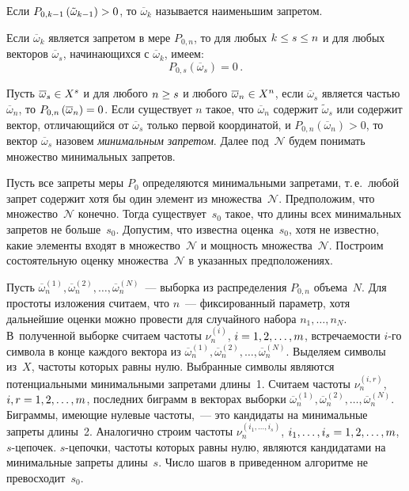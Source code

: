 \begin{multicols}{2}
  Если $P_{0,k-1}\left( \tilde{\omega}_{k-1}\right)\hm>0$, то 
$\overline{\omega}_k$ называется наименьшим запретом. 
  
  Если $\overline{\omega}_k$ является запретом в мере $P_{0,n}$, то для 
любых $k\hm\leq s\hm\leq n$ и для любых векторов $\overline{\omega}_s$, 
начинающихся с $\overline{\omega}_k$, имеем: 
  $$
  P_{0,s}\left( \overline{\omega}_s\right) =0\,.
  $$
  
  Пусть $\overline{\omega}_s\hm\in X^s$ и для любого $n\hm\geq s$ и любого 
$\overline{\omega}_n\hm\in X^n$, если $\overline{\omega}_s$ является частью 
$\overline{\omega}_n$, то $P_{0,n}\left( \overline{\omega}_n\right)\hm=0$. Если 
существует $n$ такое, что $\overline{\omega}_n$ содержит $\tilde{\omega}_s$ 
или содержит вектор, отличающийся от $\overline{\omega}_s$ только первой 
координатой, и $P_{0,n}\left( \overline{\omega}_n\right)>0$, то вектор 
$\overline{\omega}_s$ назовем \textit{минимальным запретом}. Далее 
под~$\mathcal{N}$ будем понимать множество минимальных запретов. 
  
  Пусть все запреты меры $P_0$ определяются минимальными запретами, 
т.\,е.\ любой запрет содержит хотя бы один элемент из множества~$\mathcal{N}$. 
Предположим, что множество~$\mathcal{N}$ конечно. Тогда существует~$s_0$ такое, 
что длины всех минимальных запретов не больше~$s_0$. Допустим, что 
известна оценка~$s_0$, хотя не известно, какие элементы входят в 
множество~$\mathcal{N}$ и мощность множества~$\mathcal{N}$. Построим состоятельную 
оценку множества~$\mathcal{N}$ в указанных предположениях. 
  
  Пусть $\overline{\omega}_n^{(1)}, \overline{\omega}_n^{(2)}, \ldots , 
\overline{\omega}_n^{(N)}$~--- выборка из распределения $P_{0,n}$ 
объема~$N$. Для простоты изложения считаем, что $n$~--- фиксированный 
параметр, \mbox{хотя} дальнейшие оценки можно провести для случайного набора 
$n_1, \ldots , n_N$. В~полученной выборке считаем частоты $\nu_n^{(i)}$, $i\hm=1, 
2, \ldots , m$, встречаемости $i$-го символа в конце каждого вектора из 
$\overline{\omega}_n^{(1)}, \overline{\omega}_n^{(2)}, \ldots , 
\overline{\omega}_n^{(N)}$. Выделяем символы из~$X$, час\-то\-ты которых 
равны нулю. Выбранные символы являются потенциальными минимальными 
запретами длины~1. Считаем частоты $\nu_n^{(i,r)}$, $i,r\hm=1, 2, \ldots , m$, 
последних биграмм в векторах выборки $\overline{\omega}_n^{(1)}, 
\overline{\omega}_n^{(2)}, \ldots , \overline{\omega}_n^{(N)}$. Биграммы, 
имеющие нулевые частоты,~--- это кандидаты на минимальные запреты 
длины~2. Аналогично строим частоты $\nu_n^{(i_1,\ldots , i_s)}$, $i_1,\ldots , 
i_s\hm=1, 2, \ldots , m$, $s$-це\-по\-чек. $s$-це\-поч\-ки, частоты которых 
равны нулю, являются кандидатами на минимальные запреты длины~$s$. 
Число шагов в приведенном алгоритме не превосходит~$s_0$. 
  

\end{multicols}
